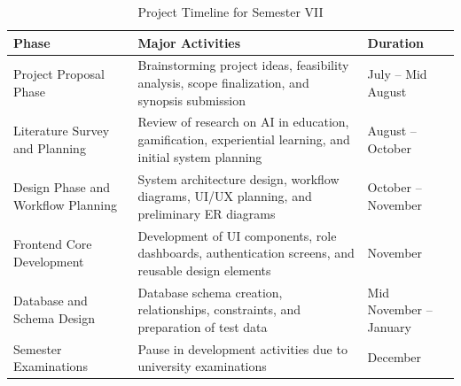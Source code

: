 \documentclass[12pt,a4paper]{report}
\begin{document}
\begin{table}[H]
\centering
\caption{Project Timeline for Semester VII}
\label{tab:timeline_sem7}
\begin{tabular}{|p{4cm}|p{8cm}|p{3cm}|}
\hline
\textbf{Phase} & \textbf{Major Activities} & \textbf{Duration} \\
\hline
Project Proposal Phase &
Brainstorming project ideas, feasibility analysis, scope finalization, and synopsis
submission &
July -- Mid August \\
\hline
Literature Survey and Planning &
Review of research on AI in education, gamification, experiential learning, and initial
system planning &
August -- October \\
\hline
Design Phase and Workflow Planning &
System architecture design, workflow diagrams, UI/UX planning, and preliminary ER
diagrams &
October -- November \\
\hline
Frontend Core Development &
Development of UI components, role dashboards, authentication screens, and reusable
design elements &
November \\
\hline
Database and Schema Design &
Database schema creation, relationships, constraints, and preparation of test data &
Mid November -- January \\
\hline
Semester Examinations &
Pause in development activities due to university examinations &
December \\
\hline
\end{tabular}
\end{table}
\end{document}
